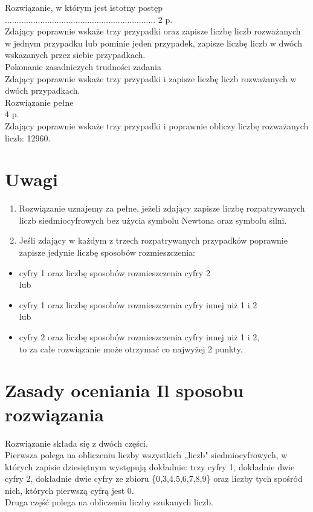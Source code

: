 \documentclass[10pt]{article}
\begin{document}
Rozwiązanie, w którym jest istotny postęp ................................................................ 2 p.\\
Zdający poprawnie wskaże trzy przypadki oraz zapisze liczbę liczb rozważanych w jednym przypadku lub pominie jeden przypadek, zapisze liczbę liczb w dwóch wskazanych przez siebie przypadkach.\\
Pokonanie zasadniczych trudności zadania\\
Zdający poprawnie wskaże trzy przypadki i zapisze liczbę liczb rozważanych w dwóch przypadkach.\\
Rozwiązanie pełne\\
4 p.\\
Zdający poprawnie wskaże trzy przypadki i poprawnie obliczy liczbę rozważanych liczb: 12960.

\section*{Uwagi}
\begin{enumerate}
  \item Rozwiązanie uznajemy za pełne, jeżeli zdający zapisze liczbę rozpatrywanych liczb siedmiocyfrowych bez użycia symbolu Newtona oraz symbolu silni.
  \item Jeśli zdający w każdym z trzech rozpatrywanych przypadków poprawnie zapisze jedynie liczbę sposobów rozmieszczenia:
\end{enumerate}

\begin{itemize}
  \item cyfry 1 oraz liczbę sposobów rozmieszczenia cyfry 2\\
lub
  \item cyfry 1 oraz liczbę sposobów rozmieszczenia cyfry innej niż 1 i 2\\
lub
  \item cyfry 2 oraz liczbę sposobów rozmieszczenia cyfry innej niż 1 i 2,\\
to za całe rozwiązanie może otrzymać co najwyżej 2 punkty.
\end{itemize}

\section*{Zasady oceniania Il sposobu rozwiązania}
Rozwiązanie składa się z dwóch części.\\
Pierwsza polega na obliczeniu liczby wszystkich „liczb" siedmiocyfrowych, w których zapisie dziesiętnym występują dokładnie: trzy cyfry 1, dokładnie dwie cyfry 2, dokładnie dwie cyfry ze zbioru \{0,3,4,5,6,7,8,9\} oraz liczby tych spośród nich, których pierwszą cyfrą jest 0.\\
Druga część polega na obliczeniu liczby szukanych liczb.
\end{document}
